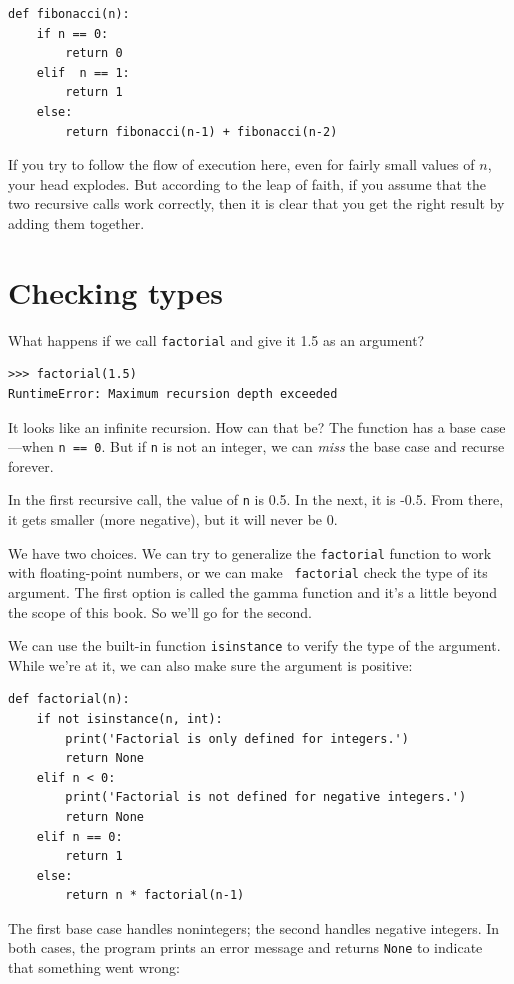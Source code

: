 \documentclass[10pt]{book}
\begin{document}
\begin{verbatim}
def fibonacci(n):
    if n == 0:
        return 0
    elif  n == 1:
        return 1
    else:
        return fibonacci(n-1) + fibonacci(n-2)
\end{verbatim}
%
If you try to follow the flow of execution here, even for fairly
small values of $n$, your head explodes.  But according to the
leap of faith, if you assume that the two recursive calls
work correctly, then it is clear that you get
the right result by adding them together.


\section{Checking types}
\label{guardian}

What happens if we call {\tt factorial} and give it 1.5 as an argument?

\begin{verbatim}
>>> factorial(1.5)
RuntimeError: Maximum recursion depth exceeded
\end{verbatim}
%
It looks like an infinite recursion.  How can that be?  The function
has a base case---when {\tt n == 0}.  But if {\tt n} is not an integer,
we can {\em miss} the base case and recurse forever.

In the first recursive call, the value of {\tt n} is 0.5.
In the next, it is -0.5.  From there, it gets smaller
(more negative), but it will never be 0.

We have two choices.  We can try to generalize the {\tt factorial}
function to work with floating-point numbers, or we can make {\tt
  factorial} check the type of its argument.  The first option is
called the gamma function and it's a
little beyond the scope of this book.  So we'll go for the second.

We can use the built-in function {\tt isinstance} to verify the type
of the argument.  While we're at it, we can also make sure the
argument is positive:

\begin{verbatim}
def factorial(n):
    if not isinstance(n, int):
        print('Factorial is only defined for integers.')
        return None
    elif n < 0:
        print('Factorial is not defined for negative integers.')
        return None
    elif n == 0:
        return 1
    else:
        return n * factorial(n-1)
\end{verbatim}
%
The first base case handles nonintegers; the
second handles negative integers.  In both cases, the program prints
an error message and returns {\tt None} to indicate that something
went wrong:
\end{document}
